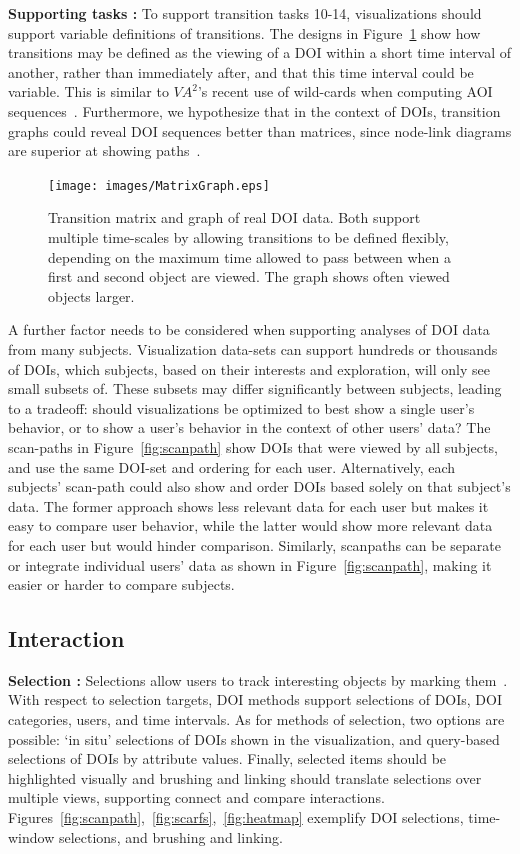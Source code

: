 \noindent \textbf{Supporting tasks :} To support transition tasks 10-14, visualizations should support variable definitions of transitions. The designs in Figure~\ref{fig:matrixGraph} show how transitions may be defined as the viewing of a DOI within a short time interval of another, rather than immediately after, and that this time interval could be variable. This is similar to $VA^2$'s recent use of wild-cards when computing AOI sequences~\cite{blascheck2016va}. Furthermore, we hypothesize that in the context of DOIs, transition graphs could reveal DOI sequences better than matrices, since node-link diagrams are superior at showing paths~\cite{ghoniem2004comparison}.

\begin{figure}[htb]
  \centering
	\texttt{[image: images/MatrixGraph.eps]}
  \caption{Transition matrix and graph of real DOI data. Both support multiple time-scales by allowing transitions to be defined flexibly, depending on the maximum time allowed to pass between when a first and second object are viewed. The graph shows often viewed objects larger.}
	\label{fig:matrixGraph}
\end{figure}

A further factor needs to be considered when supporting analyses of DOI data from many subjects. Visualization data-sets can support hundreds or thousands of DOIs, which subjects, based on their interests and exploration, will only see small subsets of. These subsets may differ significantly between subjects, leading to a tradeoff: should visualizations be optimized to best show a single user's behavior, or to show a user's behavior in the context of other users' data? The scan-paths in Figure~\ref{fig:scanpath} show DOIs that were viewed by all subjects, and use the same DOI-set and ordering for each user. Alternatively, each subjects' scan-path could also show and order DOIs based solely on that subject's data. The former approach shows less relevant data for each user but makes it easy to compare user behavior, while the latter would show more relevant data for each user but would hinder comparison. Similarly, scanpaths can be separate or integrate individual users' data as shown in Figure~\ref{fig:scanpath}, making it easier or harder to compare subjects.

\subsection{Interaction}
\label{sec:Interaction}
\noindent \textbf{Selection :} Selections allow users to track interesting objects by marking them~\cite{yi2007toward}. With respect to selection targets, DOI methods support selections of DOIs, DOI categories, users, and time intervals.  As for methods of selection, two options are possible: `in situ' selections of DOIs shown in the visualization, and query-based selections of DOIs by attribute values. Finally, selected items should be highlighted visually and brushing and linking should translate selections over multiple views, supporting connect and compare interactions. Figures~\ref{fig:scanpath},~\ref{fig:scarfs},~\ref{fig:heatmap} exemplify DOI selections, time-window selections, and brushing and linking.


